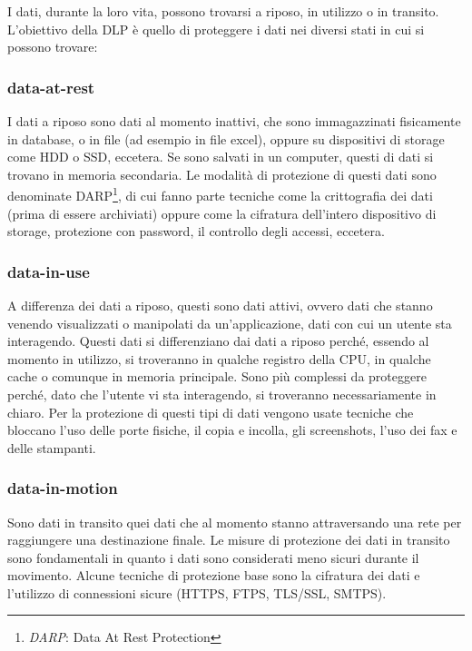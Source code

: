     \subsubsection*{}
    I dati, durante la loro vita, possono trovarsi a riposo, in utilizzo o in transito.
    L'obiettivo della DLP è quello di proteggere i dati nei diversi stati in cui si possono trovare:
    \cite{DLP1}

    \subsubsection{data-at-rest}
        I dati a riposo sono dati al momento inattivi, che sono immagazzinati fisicamente in database,
        o in file (ad esempio in file excel), oppure su dispositivi di storage come HDD o SSD, eccetera.
        Se sono salvati in un computer, questi di dati si trovano in memoria secondaria.
        Le modalità di protezione di questi dati sono denominate DARP\footnote{\textit{DARP}: Data At Rest Protection}, 
        di cui fanno parte tecniche come la crittografia dei dati (prima di essere archiviati) oppure come la cifratura
        dell'intero dispositivo di storage, protezione con password, il controllo degli accessi, eccetera.

    \subsubsection{data-in-use}
        A differenza dei dati a riposo, questi sono dati attivi, ovvero dati che stanno venendo
        visualizzati o manipolati da un'applicazione, dati con cui un utente sta interagendo. 
        Questi dati si differenziano dai dati a riposo perché, essendo al momento in utilizzo, 
        si troveranno in qualche registro della CPU, in qualche cache 
        o comunque in memoria principale. Sono più complessi da proteggere perché, dato che l'utente vi sta
        interagendo, si troveranno necessariamente in chiaro. Per la protezione di questi tipi di dati
        vengono usate tecniche che bloccano l'uso delle porte fisiche, il copia e incolla, gli screenshots, l'uso dei fax
        e delle stampanti.

    \subsubsection{data-in-motion}
        Sono dati in transito quei dati che al momento stanno attraversando una rete per raggiungere 
        una destinazione finale. Le misure di protezione dei dati in transito sono fondamentali in quanto
        i dati sono considerati meno sicuri durante il movimento.
        Alcune tecniche di protezione base sono la cifratura dei dati
        e l'utilizzo di connessioni sicure (HTTPS, FTPS, TLS/SSL, SMTPS).

